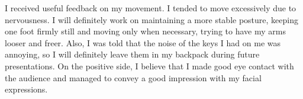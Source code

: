 \documentclass{article}
\begin{document}
I received useful feedback on my movement.
I tended to move excessively due to nervousness. I will definitely
work on maintaining a more stable posture, keeping one foot firmly
still and moving only when necessary, trying to have my arms
looser and freer. Also, I was told that the noise of the keys I had
on me was annoying, so I will definitely leave them in my backpack
during future presentations. On the positive side, I believe that I made
good eye contact with the audience and managed to convey a good
impression with my facial expressions.
\end{document}
